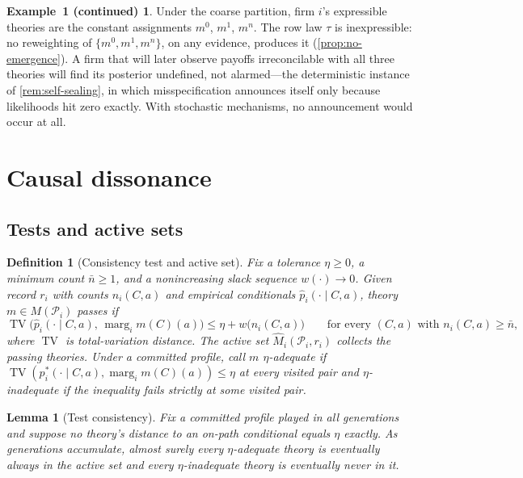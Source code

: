 \documentclass[11pt]{article}
\newtheorem{definition}[assumption]{Definition}
\newtheorem{lemma}[assumption]{Lemma}
\theoremstyle{definition}
\newtheorem*{excont}{Example~1 (continued)}
\newcommand{\TV}{\operatorname{TV}}
\newcommand{\marg}[1]{\operatorname{marg}_{#1}}
\begin{document}
\begin{excont}
Under the coarse partition, firm $i$'s expressible theories are the constant
assignments $m^0$, $m^1$, $m^n$.  The row law $\tau$ is inexpressible: no
reweighting of $\{m^0,m^1,m^n\}$, on any evidence, produces it
(\cref{prop:no-emergence}).  A firm that will later observe payoffs
irreconcilable with all three theories will find its posterior undefined, not
alarmed---the deterministic instance of \cref{rem:self-sealing}, in which
misspecification announces itself only because likelihoods hit zero exactly.
With stochastic mechanisms, no announcement would occur at all.
\end{excont}
\section{Causal dissonance}
\label{sec:dissonance}

\subsection{Tests and active sets}

\begin{definition}[Consistency test and active set]
\label{def:test}
Fix a tolerance $\eta\geq0$, a minimum count $\bar n\geq1$, and a
nonincreasing slack sequence $w(\cdot)\to0$.  Given record $r_i$ with counts
$n_i(C,a)$ and empirical conditionals $\hat p_i(\cdot\mid C,a)$, theory
$m\in M(\mathcal P_i)$ \emph{passes} if
\begin{equation}
\TV\bigl(\hat p_i(\cdot\mid C,a),\,\marg{i}m(C)(a)\bigr)
\leq
\eta+w\bigl(n_i(C,a)\bigr)
\qquad
\text{for every }(C,a)\text{ with }n_i(C,a)\geq\bar n,
\label{eq:test}
\end{equation}
where $\TV$ is total-variation distance.  The \emph{active set}
$\widehat M_i(\mathcal P_i,r_i)$ collects the passing theories.  Under a
committed profile, call $m$ \emph{$\eta$-adequate} if
$\TV(p_i^{*}(\cdot\mid C,a),\marg{i}m(C)(a))\leq\eta$ at every visited pair
and \emph{$\eta$-inadequate} if the inequality fails strictly at some visited
pair.
\end{definition}

\begin{lemma}[Test consistency]
\label{lem:test-consistency}
Fix a committed profile played in all generations and suppose no theory's
distance to an on-path conditional equals $\eta$ exactly.  As generations
accumulate, almost surely every $\eta$-adequate theory is eventually always
in the active set and every $\eta$-inadequate theory is eventually never in
it.
\end{lemma}
\end{document}
